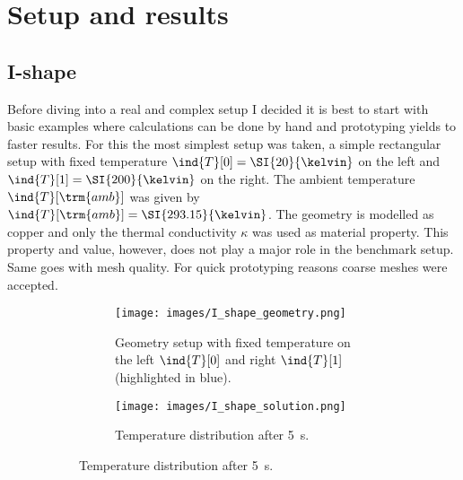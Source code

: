 \documentclass{scrartcl}
\begin{document}
\section{Setup and results}
	\subsection{I-shape}
	Before diving into a real and complex setup I decided it is best to start with basic examples where calculations can be done by hand and prototyping yields to faster results. For this the most simplest setup was taken, a simple  rectangular setup with fixed temperature $\ind{T}[0]=\SI{20}{\kelvin}$ on the left and $\ind{T}[1]=\SI{200}{\kelvin}$ on the right. The ambient temperature $\ind{T}[\trm{amb}]$ was given by $\ind{T}[\trm{amb}]=\SI{293.15}{\kelvin}$. The geometry is modelled as copper and only the thermal conductivity $\kappa$ was used as material property. This property and value, however, does not play a major role in the benchmark setup. Same goes with mesh quality. For quick prototyping reasons coarse meshes were accepted.
	\begin{figure}[H]
		\begin{figure}[H]
			\begin{minipage}[t]{0.5\linewidth}
				\begin{subfigure}[t]{\linewidth}
					\texttt{[image: images/I\_shape\_geometry.png]}
					\caption{Geometry setup with fixed temperature on the left $\ind{T}[0]$ and right $\ind{T}[1]$ (highlighted in blue).}
				\end{subfigure}
			\end{minipage}
			\begin{minipage}[t]{0.5\linewidth}
				\begin{subfigure}[t]{\linewidth}
					\texttt{[image: images/I\_shape\_solution.png]}
					\caption{Temperature distribution after \SI{5}{\second}.}
				\end{subfigure}
			\end{minipage}
		\end{figure}
		\caption{}
		\label{}
	\end{figure}
\end{document}
